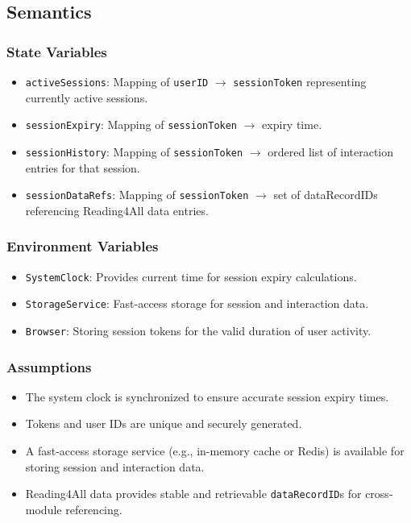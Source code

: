 \documentclass[12pt, titlepage]{article}
\begin{document}
\subsection{Semantics}

\subsubsection{State Variables}
\begin{itemize}
  \item \texttt{activeSessions}: Mapping of \texttt{userID}
    $\rightarrow$ \texttt{sessionToken} representing currently active sessions.
  \item \texttt{sessionExpiry}: Mapping of \texttt{sessionToken}
    $\rightarrow$ expiry time.
  \item \texttt{sessionHistory}: Mapping of \texttt{sessionToken}
    $\rightarrow$ ordered list of interaction entries for that session.
  \item \texttt{sessionDataRefs}: Mapping of \texttt{sessionToken}
    $\rightarrow$ set of dataRecordIDs referencing Reading4All data entries.
\end{itemize}

\subsubsection{Environment Variables}
\begin{itemize}
  \item \texttt{SystemClock}: Provides current time for session
    expiry calculations.
  \item \texttt{StorageService}: Fast-access storage for session and
    interaction data.
  \item \texttt{Browser}: Storing session tokens for the valid
    duration of user activity.
\end{itemize}

\subsubsection{Assumptions}
\begin{itemize}
  \item The system clock is synchronized to ensure accurate session
    expiry times.
  \item Tokens and user IDs are unique and securely generated.
  \item A fast-access storage service (e.g., in-memory cache or
    Redis) is available for storing session and interaction data.
  \item Reading4All data provides stable and retrievable
    \texttt{dataRecordID}s for cross-module referencing.
\end{itemize}
\end{document}
